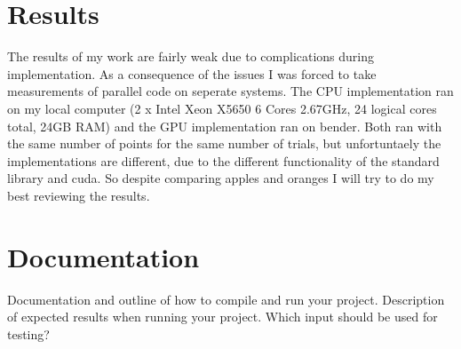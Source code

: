 \documentclass{article}
\begin{document}
\section{Results}
The results of my work are fairly weak due to complications during implementation. As a consequence of the issues I was forced to take measurements of parallel code on seperate systems. The CPU implementation ran on my local computer (2 x Intel Xeon X5650 6 Cores 2.67GHz, 24 logical cores total, 24GB RAM) and the GPU implementation ran on bender. Both ran with the same number of points for the same number of trials, but unfortuntaely the implementations are different, due to the different functionality of the standard library and cuda. So despite comparing apples and oranges I will try to do my best reviewing the results. 



\section{Documentation}
Documentation and outline of how to compile and run your project. Description of expected results when running your project. Which input should be used for testing?
\end{document}
